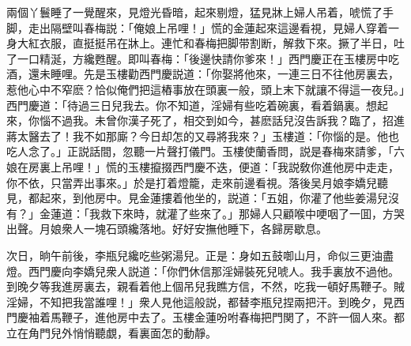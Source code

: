 兩個丫鬟睡了一覺醒來，見燈光昏暗，起來剔燈，猛見牀上婦人吊着，唬慌了手脚，走出隔壁叫春梅説：「俺娘上吊哩！」慌的金蓮起來這邊看視，見婦人穿着一身大紅衣服，直挺挺吊在牀上。連忙和春梅把脚带割断，解救下來。撅了半日，吐了一口精涎，方纔甦醒。即叫春梅：「後邊快請你爹來！」西門慶正在玉樓房中吃酒，還未睡哩。先是玉樓勸西門慶説道：「你娶將他來，一連三日不往他房裏去，惹他心中不窄麽？恰似俺們把這樁事放在頭裏一般，頭上末下就讓不得這一夜兒。」西門慶道：「待過三日兒我去。你不知道，淫婦有些吃着碗裏，看着鍋裏。想起來，你惱不過我。未曾你漢子死了，相交到如今，甚麽話兒沒告訴我？臨了，招進蔣太醫去了！我不如那廝？今日却怎的又尋將我來？」玉樓道：「你惱的是。他也吃人念了。」正説話間，忽聽一片聲打儀門。玉樓使蘭香問，説是春梅來請爹，「六娘在房裏上吊哩！」慌的玉樓攛掇西門慶不迭，便道：「我説敎你進他房中走走，你不依，只當弄出事來。」於是打着燈籠，走來前邊看視。落後吴月娘李嬌兒聽見，都起來，到他房中。見金蓮摟着他坐的，説道：「五姐，你灌了他些姜湯兒沒有？」金蓮道：「我救下來時，就灌了些來了。」那婦人只顧喉中哽咽了一囬，方哭出聲。月娘衆人一塊石頭纔落地。好好安撫他睡下，各歸房歇息。

次日，晌午前後，李瓶兒纔吃些粥湯兒。正是：身如五鼓啣山月，命似三更油盡燈。西門慶向李嬌兒衆人説道：「你們休信那淫婦裝死兒唬人。我手裏放不過他。到晚夕等我進房裏去，親看着他上個吊兒我瞧方信，不然，吃我一頓好馬鞭子。賊淫婦，不知把我當誰哩！」衆人見他這般説，都替李瓶兒捏兩把汗。到晚夕，見西門慶袖着馬鞭子，進他房中去了。玉樓金蓮吩咐春梅把門関了，不許一個人來。都立在角門兒外悄悄聽覷，看裏面怎的動靜。

